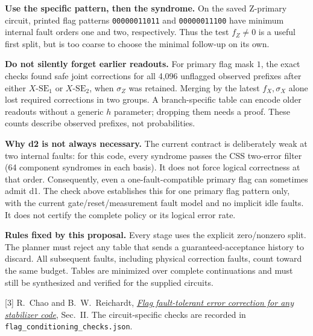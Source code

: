 \documentclass[11pt,a4paper]{article}
\newcommand{\SE}[2]{\ensuremath{#1\text{-}\mathrm{SE}_{#2}}}
\begin{document}
\textbf{Use the specific pattern, then the syndrome.}
On the saved Z-primary circuit, printed flag patterns
\texttt{00000011011} and \texttt{00000011100} have minimum internal fault
orders one and two, respectively. Thus the test $f_Z\ne0$ is a useful first
split, but is too coarse to choose the minimal follow-up on its own.

\textbf{Do not silently forget earlier readouts.}
For primary flag mask $1$, the exact checks found safe joint corrections for
all 4,096 unflagged observed prefixes after either \SE{X}{1} or \SE{X}{2},
when $\sigma_Z$ was retained. Merging by the latest $f_X,\sigma_X$ alone
lost required corrections in two groups. A branch-specific table can encode
older readouts without a generic $h$ parameter; dropping them needs a proof.
These counts describe observed prefixes, not probabilities.

\textbf{Why d2 is not always necessary.}
The current contract is deliberately weak at two internal faults: for this
code, every syndrome passes the CSS two-error filter (64 component syndromes
in each basis). It does not force logical correctness at that order.
Consequently, even a one-fault-compatible primary flag can sometimes admit d1.
The check above establishes this for one primary flag pattern only, with the
current gate/reset/measurement fault model and no implicit idle faults.
It does not certify the complete policy or its logical error rate.

\textbf{Rules fixed by this proposal.}
Every stage uses the explicit zero/nonzero split. The planner must reject
any table that sends a guaranteed-acceptance history to discard.
All subsequent faults, including physical correction faults, count toward
the same budget. Tables are minimized over complete continuations and must
still be synthesized and verified for the supplied circuits.

{\footnotesize
[3] R.~Chao and B.~W.~Reichardt,
\href{https://arxiv.org/abs/1912.09549}{\emph{Flag fault-tolerant error correction
for any stabilizer code}}, Sec.~II.
The circuit-specific checks are recorded in \texttt{flag\_conditioning\_checks.json}.
}
\end{document}

